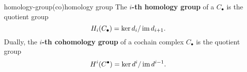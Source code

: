 

    

\begin{topic}{homology-group}{(co)homology group}
    The \textbf{$i$-th homology group} of a  $C_\bullet$ is the quotient group
    \[ H_i(C_\bullet) = \ker d_i / \operatorname{im} d_{i + 1} . \]
    Dually, the \textbf{$i$-th cohomology group} of a cochain complex $C_\bullet$ is the quotient group
    \[ H^i(C^\bullet) = \ker d^i / \operatorname{im} d^{i - 1} . \]
\end{topic}

